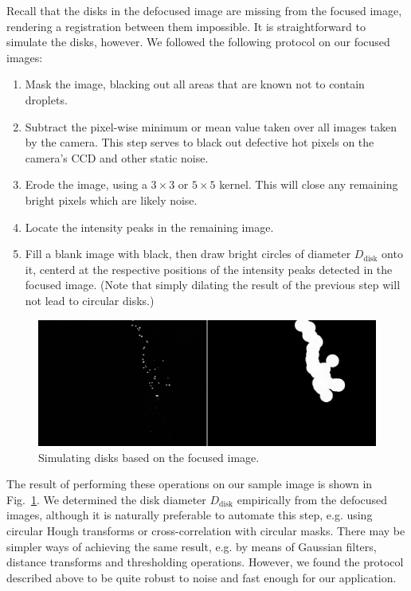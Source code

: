 \documentclass[11.5pt,oneside]{book}
\newcommand*{\figref}[1]{Fig.~\ref{#1}}
\begin{document}
Recall that the disks in the defocused image are missing from the focused image,
rendering a registration between them impossible. It is straightforward to
simulate the disks, however. We followed the following protocol on our focused
images:
\begin{enumerate}
    \item Mask the image, blacking out all areas that are known not to contain
        droplets.
    \item Subtract the pixel-wise minimum or mean value taken over all images
        taken by the camera. This step serves to black out defective hot pixels
        on the camera's CCD and other static noise.
    \item Erode the image, using a $3\times 3$ or $5\times 5$ kernel. This will
        close any remaining bright pixels which are likely noise.
    \item Locate the intensity peaks in the remaining image.
    \item Fill a blank image with black, then draw bright circles of diameter
        $D_\text{disk}$ onto it, centerd at the respective positions of the
        intensity peaks detected in the focused image. (Note that simply dilating
        the result of the previous step will not lead to circular disks.)
\end{enumerate}
\begin{figure}
    \centering
    \includegraphics[width=\textwidth]{img/orb/dilation.jpg}
    \caption{Simulating disks based on the focused image. \label{fig:making-disks}}
\end{figure}

The result of performing these operations on our sample image is shown in \figref{fig:making-disks}. We determined the disk diameter $D_\text{disk}$
empirically from the defocused images, although it is naturally preferable to
automate this step, e.g. using circular Hough transforms or cross-correlation
with circular masks. There may be simpler ways of achieving the same result,
e.g. by means of Gaussian filters, distance transforms and thresholding
operations. However, we found the protocol described above to be quite robust to
noise and fast enough for our application.
\end{document}

